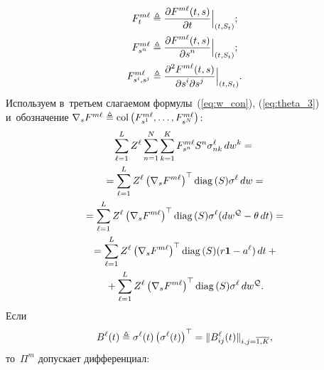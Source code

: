 \begin{multicols}{2}
\vspace*{-3pt}

\noindent
\begin{align*}
F_t^{m\ell} &\triangleq \displaystyle\frac{\displaystyle \partial F^{m\ell}(t,s)\mathstrut}{\displaystyle \partial t\mathstrut}\Bigl|_{(t,S_t)};\\
F_{s^n}^{m\ell} &\triangleq \displaystyle\frac{\displaystyle \partial F^{m\ell}(t,s)\mathstrut}{\displaystyle \partial s^n\mathstrut}\Bigl|_{(t,S_t)}; \\
F_{s^i,s^j}^{m\ell}& \triangleq \displaystyle\frac{\displaystyle \partial^2 F^{m\ell}(t,s)\mathstrut}{\displaystyle \partial s^i \partial s^j\mathstrut}\Bigl|_{(t,S_t)}.
\end{align*}
Используем в~третьем слагаемом формулы~(\ref{eq:w_con}), (\ref{eq:theta_3}) и~обозначение
$\nabla_s F^{m\ell} \triangleq \mathrm{col} \left(
F_{s^1}^{m\ell},\ldots, F_{s^N}^{m\ell}
\right)$:
\begin{multline*}
\sum\limits_{\ell=1}^L Z^{\ell} \sum\limits_{n=1}^N \sum\limits_{k=1}^K
F_{s^n}^{m\ell} S^n \sigma_{nk}^{\ell}\, dw^k ={}\\
{}= \sum\limits_{\ell=1}^L Z^{\ell}
\left( \nabla_s F^{m\ell} \right)^{\top} \mathrm{diag}\, (S) \sigma^{\ell}\,dw = {}\\ 
{}=
\sum\limits_{\ell=1}^L Z^{\ell}
\left( \nabla_s F^{m\ell} \right)^{\top} \mathrm{diag}\,(S) \sigma^{\ell}(dw^{{\mathcal Q}}-\theta \,dt) ={} \\
{} =
\sum\limits_{\ell=1}^L Z^{\ell}
\left( \nabla_s F^{m\ell} \right)^{\top} \mathrm{diag}\, (S)(r \mathbf{1} - a^{\ell})\,dt+{}\\
{}+
\sum\limits_{\ell=1}^L Z^{\ell}
\left( \nabla_s F^{m\ell} \right)^{\top} \mathrm{diag}\, (S) \sigma^{\ell}\,dw^{{\mathcal Q}}.
\end{multline*}
Если 
$$
B^{\ell}(t) \ebd \sigma^{\ell}(t)\left(\sigma^{\ell}(t)\right)^{\top}\hm=\|B_{ij}^{\ell}(t)\|_{i,j=\overline{1,K}},
$$
то~$\Pi^m$ допускает дифференциал:

\columnbreak


\end{multicols}
